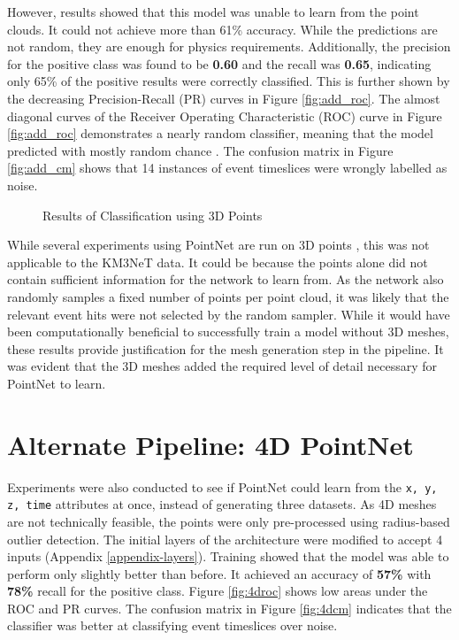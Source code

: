 However, results showed that this model was unable to learn from the point clouds. It could not achieve more than 61\% accuracy. While the predictions are not random, they are enough for physics requirements. Additionally, the precision for the positive class was found to be \textbf{0.60} and the recall was \textbf{0.65}, indicating only 65\% of the positive results were correctly classified. This is further shown by the decreasing Precision-Recall (PR) curves in Figure \ref{fig:add_roc}. The almost diagonal curves of the Receiver Operating Characteristic (ROC) curve in Figure \ref{fig:add_roc} demonstrates a nearly random classifier, meaning that the model predicted with mostly random chance \cite{scikit-learn}. The confusion matrix in Figure \ref{fig:add_cm} shows that 14 instances of event timeslices were wrongly labelled as noise. 

\begin{figure}[ht!]   
\centering
{}
\caption[]{Results of Classification using 3D Points}
\label{fig:points}
\end{figure}

While several experiments using PointNet are run on 3D points \cite{aoki2019pointnetlk, ge2018hand, garcia2016pointnet}, this was not applicable to the KM3NeT data. It could be because the points alone did not contain sufficient information for the network to learn from. As the network also randomly samples a fixed number of points per point cloud, it was likely that the relevant event hits were not selected by the random sampler. While it would have been computationally beneficial to successfully train a model without 3D meshes, these results provide justification for the mesh generation step in the pipeline. It was evident that the 3D meshes added the required level of detail necessary for PointNet to learn. 

\section{Alternate Pipeline: 4D PointNet}
\label{sec:additional-4d}
Experiments were also conducted to see if PointNet could learn from the \texttt{x, y, z, time} attributes at once, instead of generating three datasets. As 4D meshes are not technically feasible, the points were only pre-processed using radius-based outlier detection. The initial layers of the architecture were modified to accept 4 inputs (Appendix \ref{appendix-layers}). Training showed that the model was able to perform only slightly better than before. It achieved an accuracy of \textbf{57\%} with \textbf{78\%} recall for the positive class. Figure \ref{fig:4droc} shows low areas under the ROC and PR curves. The confusion matrix in Figure \ref{fig:4dcm} indicates that the classifier was better at classifying event timeslices over noise. 

